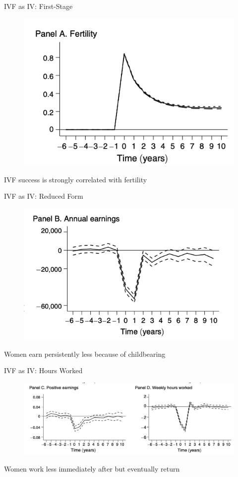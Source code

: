 \documentclass[11pt,notes=hide,aspectratio=169,mathserif]{beamer}
\begin{document}
\begin{frame}{IVF as IV: First-Stage}
\begin{figure}
\centering
\includegraphics[width=0.6\linewidth]{inputs/ivf4.png}
\end{figure}
IVF success is strongly correlated with fertility
\end{frame}

\begin{frame}{IVF as IV: Reduced Form}
\begin{figure}
\centering
\includegraphics[width=0.6\linewidth]{inputs/ivf5.png}
\end{figure}
Women earn persistently less because
of childbearing 
\end{frame}

\begin{frame}{IVF as IV: Hours Worked}
\begin{figure}
\centering
\includegraphics[width=1.0\linewidth]{inputs/ivf6.png}
\end{figure}
Women work less immediately after but eventually return
\end{frame}
\end{document}
